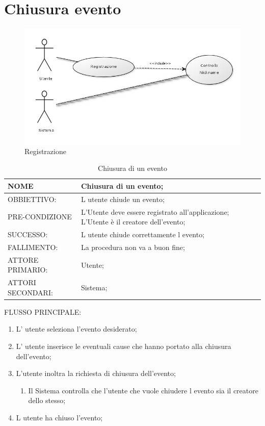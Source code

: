 \section{Chiusura evento}
\begin{figure}[H]
\centering
\includegraphics[scale=0.55]{img/registrazione.png}
\caption{Registrazione}
\label{fig:registrazione}
\end{figure}
\begin{table}[H]
\begin{tabular}{p{}|p{}}
\toprule
NOME & Chiusura di un evento;\\
\hline
OBBIETTIVO: & L utente chiude un evento;\\
\hline
PRE-CONDIZIONE & L'Utente deve essere registrato all'applicazione;
L'Utente è il creatore dell'evento;\\
\hline
SUCCESSO: & L utente chiude correttamente l evento;\\
\hline
FALLIMENTO: & La procedura non va a buon fine;\\
\hline
ATTORE PRIMARIO: & Utente;\\
\hline
ATTORI SECONDARI: & Sistema;\\
\bottomrule
\end{tabular}
\caption{Chiusura di un evento}
\label{table:chiude}
\end{table}	

FLUSSO PRINCIPALE:
\begin{enumerate}
\item L' utente seleziona l'evento desiderato;
\item L' utente inserisce le eventuali cause che hanno portato alla chiusura dell'evento;
\item L'utente inoltra la richiesta di chiusura dell'evento;
\begin{enumerate}
\item Il Sistema controlla che l'utente che vuole chiudere l evento sia il creatore dello stesso;
\end{enumerate}
\item L utente ha chiuso l'evento;
\end{enumerate}


